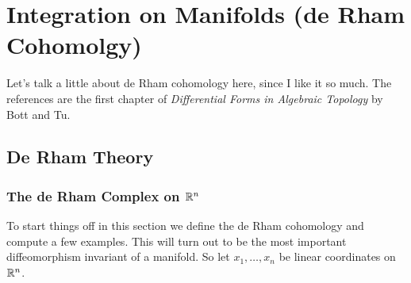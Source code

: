 \chapter{Integration on Manifolds (de Rham Cohomolgy)}
Let's talk a little about de Rham cohomology here, since I like it so
much. The references are the first chapter of \emph{Differential Forms in
  Algebraic Topology} by Bott and Tu.
\section{De Rham Theory}
\subsection{The de Rham Complex on $\mathbb{R}^n$}
To start things off in this section we define the de Rham cohomology and
compute a few examples. This will turn out to be the most important
diffeomorphism invariant of a manifold. So let $x_1,\dotsc,x_n$ be linear
coordinates on $\mathbb{R}^n$.


